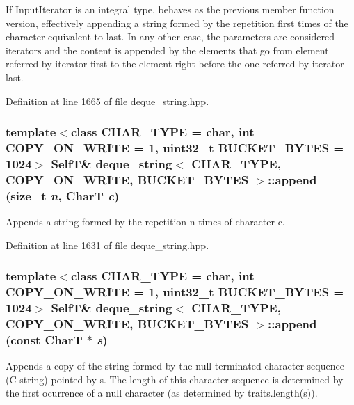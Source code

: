 If InputIterator is an integral type, behaves as the previous member function version, effectively appending a string formed by the repetition first times of the character equivalent to last. In any other case, the parameters are considered iterators and the content is appended by the elements that go from element referred by iterator first to the element right before the one referred by iterator last. 

Definition at line 1665 of file deque\_\-string.hpp.\hypertarget{classdeque__string_1b25953cd90a749e1381220ba20bb42e}{
\subsubsection[{append}]{\setlength{\rightskip}{0pt plus 5cm}template$<$class CHAR\_\-TYPE  = char, int COPY\_\-ON\_\-WRITE = 1, uint32\_\-t BUCKET\_\-BYTES = 1024$>$ {\bf SelfT}\& {\bf deque\_\-string}$<$ CHAR\_\-TYPE, COPY\_\-ON\_\-WRITE, BUCKET\_\-BYTES $>$::append (size\_\-t {\em n}, \/  CharT {\em c})}}
\label{classdeque__string_1b25953cd90a749e1381220ba20bb42e}


Appends a string formed by the repetition n times of character c. 

Definition at line 1631 of file deque\_\-string.hpp.\hypertarget{classdeque__string_bc602a34e52a44a96690152a296ffb71}{
\subsubsection[{append}]{\setlength{\rightskip}{0pt plus 5cm}template$<$class CHAR\_\-TYPE  = char, int COPY\_\-ON\_\-WRITE = 1, uint32\_\-t BUCKET\_\-BYTES = 1024$>$ {\bf SelfT}\& {\bf deque\_\-string}$<$ CHAR\_\-TYPE, COPY\_\-ON\_\-WRITE, BUCKET\_\-BYTES $>$::append (const CharT $\ast$ {\em s})}}
\label{classdeque__string_bc602a34e52a44a96690152a296ffb71}


Appends a copy of the string formed by the null-terminated character sequence (C string) pointed by s. The length of this character sequence is determined by the first ocurrence of a null character (as determined by traits.length(s)). 


